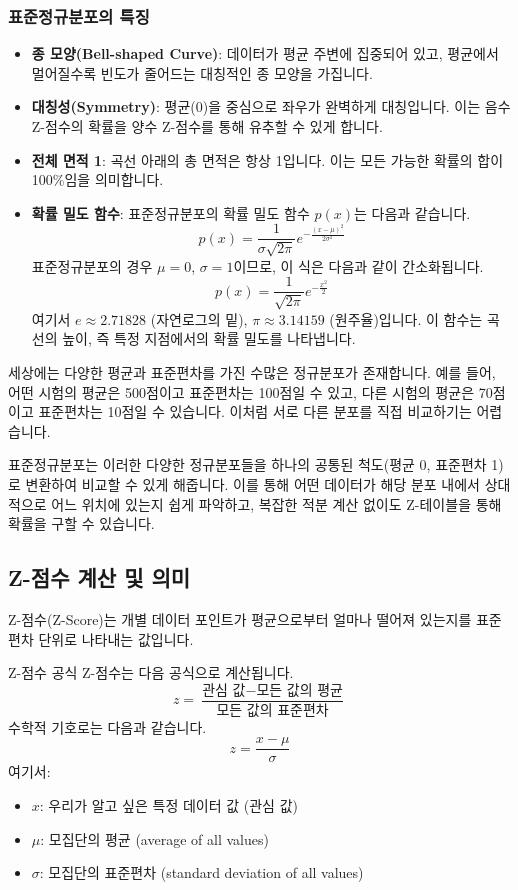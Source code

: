 \documentclass[11pt,a4paper]{article}
\begin{document}
\subsubsection*{표준정규분포의 특징}
\begin{itemize}
    \item \textbf{종 모양(Bell-shaped Curve)}: 데이터가 평균 주변에 집중되어 있고, 평균에서 멀어질수록 빈도가 줄어드는 대칭적인 종 모양을 가집니다.
    \item \textbf{대칭성(Symmetry)}: 평균(0)을 중심으로 좌우가 완벽하게 대칭입니다. 이는 음수 Z-점수의 확률을 양수 Z-점수를 통해 유추할 수 있게 합니다.
    \item \textbf{전체 면적 1}: 곡선 아래의 총 면적은 항상 1입니다. 이는 모든 가능한 확률의 합이 100\%임을 의미합니다.
    \item \textbf{확률 밀도 함수}: 표준정규분포의 확률 밀도 함수 $p(x)$는 다음과 같습니다.
    \[ p(x) = \frac{1}{\sigma\sqrt{2\pi}} e^{-\frac{(x-\mu)^2}{2\sigma^2}} \]
    표준정규분포의 경우 $\mu=0$, $\sigma=1$이므로, 이 식은 다음과 같이 간소화됩니다.
    \[ p(x) = \frac{1}{\sqrt{2\pi}} e^{-\frac{x^2}{2}} \]
    여기서 $e \approx 2.71828$ (자연로그의 밑), $\pi \approx 3.14159$ (원주율)입니다. 이 함수는 곡선의 높이, 즉 특정 지점에서의 확률 밀도를 나타냅니다.
\end{itemize}

\begin{tcolorbox}[title=\textbf{왜 표준정규분포가 필요한가?}, colback=gray!5!white, colframe=gray!75!black]
세상에는 다양한 평균과 표준편차를 가진 수많은 정규분포가 존재합니다. 예를 들어, 어떤 시험의 평균은 500점이고 표준편차는 100점일 수 있고, 다른 시험의 평균은 70점이고 표준편차는 10점일 수 있습니다. 이처럼 서로 다른 분포를 직접 비교하기는 어렵습니다.

표준정규분포는 이러한 다양한 정규분포들을 하나의 공통된 척도(평균 0, 표준편차 1)로 변환하여 비교할 수 있게 해줍니다. 이를 통해 어떤 데이터가 해당 분포 내에서 상대적으로 어느 위치에 있는지 쉽게 파악하고, 복잡한 적분 계산 없이도 Z-테이블을 통해 확률을 구할 수 있습니다.
\end{tcolorbox}

\subsection*{Z-점수 계산 및 의미}
Z-점수(Z-Score)는 개별 데이터 포인트가 평균으로부터 얼마나 떨어져 있는지를 표준편차 단위로 나타내는 값입니다.

\begin{keyconceptbox}{Z-점수 공식}
Z-점수는 다음 공식으로 계산됩니다.
\[ z = \frac{\text{관심 값} - \text{모든 값의 평균}}{\text{모든 값의 표준편차}} \]
수학적 기호로는 다음과 같습니다.
\[ z = \frac{x - \mu}{\sigma} \]
여기서:
\begin{itemize}
    \item $x$: 우리가 알고 싶은 특정 데이터 값 (관심 값)
    \item $\mu$: 모집단의 평균 (average of all values)
    \item $\sigma$: 모집단의 표준편차 (standard deviation of all values)
\end{itemize}
\end{keyconceptbox}
\end{document}
